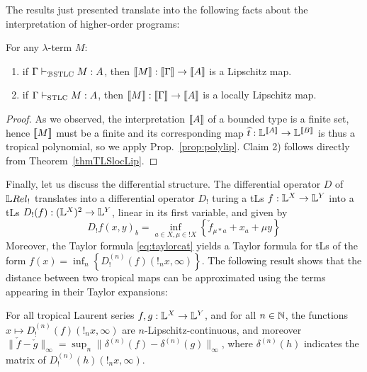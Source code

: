 The results just presented translate into the following facts about the interpretation of higher-order programs:
\begin{corollary}
For any $\lambda$-term $M$:
\begin{enumerate}
\item if $\Gamma \vdash_{\mathcal{B}\mathrm{STLC}} M:A$, then $\llbracket M\rrbracket:\llbracket\Gamma\rrbracket \to \llbracket A\rrbracket$ is a Lipschitz map.
\item if $\Gamma \vdash_{\mathrm{STLC}}M:A$, then $\llbracket M\rrbracket: \llbracket\Gamma\rrbracket \to \llbracket A\rrbracket$ is a locally Lipschitz map.
\end{enumerate}
\end{corollary} 
\begin{proof}
As we observed, the interpretation $\llbracket A\rrbracket$ of a bounded type is a finite set, hence $\llbracket M\rrbracket$ must be a finite  and  its corresponding map $\widehat t:\mathbb{L}^{\llbracket A\rrbracket} \to \mathbb{L}^{\llbracket B\rrbracket}$ is thus a tropical polynomial, so we apply Prop.~\ref{prop:polylip}.
Claim 2) follows directly from Theorem~\ref{thmTLSlocLip}.
\end{proof}


Finally, let us discuss the differential structure. The differential operator $D$ of $\LREL_{!}$ translates into a differential operator $D_{!}$ turing a tLs $f:\mathbb{L}^{X}\to \mathbb{L}^{Y}$ into a tLs $D_{!}(f):(\mathbb{L}^{X})^{2}\to \mathbb{L}^{Y}$, linear in its first variable, and given by 
\begin{equation}
D_{!}f(x,y)_{b}=\inf_{a\in X, \mu\in !X}\left\{\check f_{\mu*a}+x_{a}+\mu y\right\}
\end{equation}
Moreover, the Taylor formula \eqref{eq:taylorcat} yields 
a Taylor formula for tLs of the form 
$f(x)=\inf_{n}\left\{D_{!}^{(n)}(f)(!_{n}x,\infty)\right\}$.
The following result shows that the distance between two tropical maps can be approximated using the terms appearing in their Taylor expansions:
\begin{proposition}
For all tropical Laurent series $f,g: \mathbb{L}^{X}\to \mathbb{L}^{Y}$, and for all $n\in \mathbb{N}$, 
the functions $x\mapsto D_{!}^{(n)}(f)(!_{n}x,\infty)$ are $n$-Lipschitz-continuous, and moreover 
$\| \check f-\check g\|_{\infty}= \sup_{n} \| {\delta^{(n)}(f)}- {\delta^{(n)}(g)}\|_{\infty}$, 
where $\delta^{(n)}(h)$ indicates the matrix of $D_{!}^{(n)}(h)(!_{n}x,\infty)$.
\end{proposition} 



